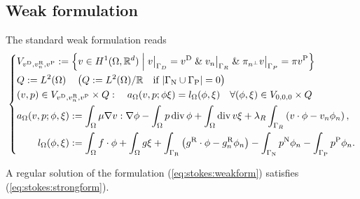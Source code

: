 \subsection{Weak formulation}\label{subsec:}
%
The standard weak formulation reads
%
\begin{equation}\label{eq:stokes:weakform}
%
\left\{
\begin{aligned}
&V_{\vD,\vRn,\vP} :=  \SetDef{v\in H^1(\Omega,\R^d)}{\Rest{v}{\Gamma_D}=\vD\;\&\; \Rest{v_n}{\Gamma_R}\;\&\; \Rest{\pitang v}{\Gamma_P}=\pi\vP}\\&Q := L^2(\Omega)
\quad \left( Q := L^2(\Omega)/\R \quad\mbox{if $\abs{\GammaN\cup\GammaP}=0$}\right)\\
&(v,p)\in V_{\vD,\vRn,\vP}\times Q:\quad a_{\Omega}(v,p; \phi\xi)  = l_{\Omega}(\phi,\xi) \quad\forall (\phi,\xi)\in V_{0,0,0}\times Q\\
&\begin{aligned}
a_{\Omega}(v,p; \phi,\xi) &:= \int_{\Omega} \mu \nabla v:\nabla\phi - \int_{\Omega}p \div \phi + \int_{\Omega} \div v \xi
+ \lambda_R\int_{\Gamma_R}\left(v\cdot\phi - v_n\phi_n\right),\\
 l_{\Omega}(\phi,\xi) &:= \int_{\Omega} f\cdot\phi + \int_{\Omega} g\xi + \int_{\GammaR}\left(\gR\cdot\phi - \gR_n\phi_n\right)
 -\int_{\GammaN}\pN \phi_n -\int_{\GammaP}\pP \phi_n.
\end{aligned}
\end{aligned}
\right.
%
\end{equation}
%
\begin{lemma}\label{lemma:}
A regular solution of the formulation (\ref{eq:stokes:weakform}) satisfies (\ref{eq:stokes:strongform}).
\end{lemma}
%
